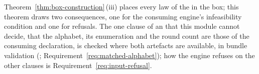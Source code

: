 
Theorem~\ref{thm:box-construction}\,(iii) places every law of the  in
the box; this theorem draws two consequences, one for the consuming engine's
infeasibility condition and one for refusals. The one clause of an
 that this module cannot decide, that the alphabet, its
enumeration and the round count are those of the consuming declaration, is
checked where both artefacts are available, in bundle validation
(;
Requirement~\ref{req:matched-alphabet});
how the engine refuses on the other clauses is
Requirement~\ref{req:input-refusal}.

